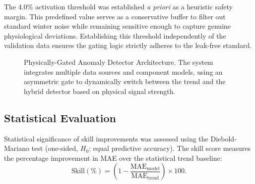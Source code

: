 The 4.0\% activation threshold was established \textit{a priori} as a heuristic safety margin. This predefined value serves as a conservative buffer to filter out standard winter noise while remaining sensitive enough to capture genuine physiological deviations. Establishing this threshold independently of the validation data ensures the gating logic strictly adheres to the leak-free standard.

\vspace{1em}
\begin{figure}[h]
    \centering
    \resizebox{\linewidth}{!}{}
    \caption{Physically-Gated Anomaly Detector Architecture. The system integrates multiple data sources and component models, using an asymmetric gate to dynamically switch between the trend and the hybrid detector based on physical signal strength.}
    \label{fig:flowchart}
\end{figure}

\subsection{Statistical Evaluation}
Statistical significance of skill improvements was assessed using the Diebold-Mariano test (one-sided, $H_0$: equal predictive accuracy). The skill score measures the percentage improvement in MAE over the statistical trend baseline:
\[
\text{Skill}(\%) = \left(1 - \frac{\text{MAE}_{\text{model}}}
{\text{MAE}_{\text{trend}}}\right) \times 100.
\]